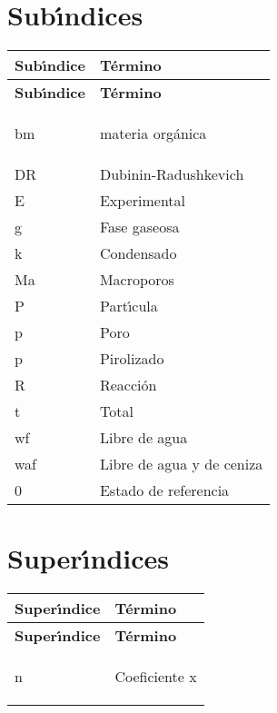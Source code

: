 \section*{Sub\'{\i}ndices}
\begin{longtable}[l]{>{}l<{}l}
  \textbf{Sub\'{\i}ndice} & \textbf{T\'{e}rmino} \\[0.5ex] \hline%
  \endfirsthead%
  \textbf{Sub\'{\i}ndice} & \textbf{T\'{e}rmino} \\[0.5ex] \hline%
  \endhead%
\renewcommand{\arraystretch}{1.4}\label{simbolosg}

 bm&materia org\'{a}nica\\%
 DR&Dubinin-Radushkevich\\%
 E&Experimental\\%
 g&Fase gaseosa\\%
 k&Condensado\\%
 Ma&Macroporos\\%
 P&Part\'{\i}cula\\%
 p&Poro\\%
 p&Pirolizado\\%
 R&Reacci\'{o}n\\%
 t&Total\\%
 wf&Libre de agua\\%
 waf&Libre de agua y de ceniza\\%
 0&Estado de referencia\\%

\end{longtable}


\setlength{\extrarowheight}{0pt}


\section*{Super\'{\i}ndices}
\begin{longtable}[l]{>{}l<{}l}
  \textbf{Super\'{\i}ndice} & \textbf{T\'{e}rmino} \\[0.5ex] \hline%
  \endfirsthead%
  \textbf{Super\'{\i}ndice} & \textbf{T\'{e}rmino} \\[0.5ex] \hline%
  \endhead%
\renewcommand{\arraystretch}{1.4}\label{simbolosg}

 n &Coeficiente x\\%



\end{longtable}


\setlength{\extrarowheight}{0pt}


